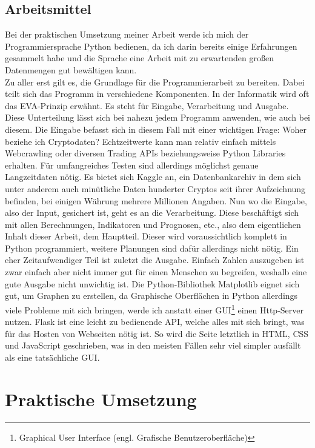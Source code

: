 \documentclass[12pt]{article}
\begin{document}
\subsection{Arbeitsmittel}
	Bei der praktischen Umsetzung meiner Arbeit werde ich mich der Programmiersprache Python bedienen, da ich darin bereits einige Erfahrungen gesammelt habe und die Sprache eine Arbeit mit zu erwartenden großen Datenmengen gut bewältigen kann.\\
	Zu aller erst gilt es, die Grundlage für die Programmierarbeit zu bereiten. Dabei teilt sich das Programm in verschiedene Komponenten. In der Informatik wird oft das EVA-Prinzip erwähnt. Es steht für Eingabe, Verarbeitung und Ausgabe. Diese Unterteilung lässt sich bei nahezu jedem Programm anwenden, wie auch bei diesem. Die Eingabe befasst sich in diesem Fall mit einer wichtigen Frage: Woher beziehe ich Cryptodaten? Echtzeitwerte kann man relativ einfach mittels Webcrawling oder diversen Trading APIs beziehungsweise Python Libraries erhalten. Für umfangreiches Testen sind allerdings möglichst genaue Langzeitdaten nötig. Es bietet sich Kaggle an, ein Datenbankarchiv in dem sich unter anderem auch minütliche Daten hunderter Cryptos seit ihrer Aufzeichnung befinden, bei einigen Währung mehrere Millionen Angaben.
	Nun wo die Eingabe, also der Input, gesichert ist, geht es an die Verarbeitung. Diese beschäftigt sich mit allen Berechnungen, Indikatoren und Prognosen, etc., also dem eigentlichen Inhalt dieser Arbeit, dem Hauptteil. Dieser wird voraussichtlich komplett in Python programmiert, weitere Planungen sind dafür allerdings nicht nötig.
	Ein eher Zeitaufwendiger Teil ist zuletzt die Ausgabe. Einfach Zahlen auszugeben ist zwar einfach aber nicht immer gut für einen Menschen zu begreifen, weshalb eine gute Ausgabe nicht unwichtig ist. Die Python-Bibliothek Matplotlib eignet sich gut, um Graphen zu erstellen, da Graphische Oberflächen in Python allerdings viele Probleme mit sich bringen, werde ich anstatt einer GUI\footnote{Graphical User Interface (engl. Grafische Benutzeroberfläche)} einen Http-Server nutzen. Flask ist eine leicht zu bedienende API, welche alles mit sich bringt, was für das Hosten von Webseiten nötig ist. So wird die Seite letztlich in HTML, CSS und JavaScript geschrieben, was in den meisten Fällen sehr viel simpler ausfällt als eine tatsächliche GUI.

\section{Praktische Umsetzung}
\end{document}
